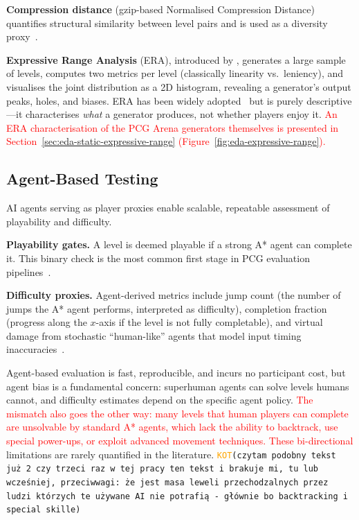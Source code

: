 \documentclass[shortabstract, mgr, english]{iithesis}
\newcommand{\DEBUG}[1]{{#1}} %
\newcommand{\KOT}[1]{\DEBUG{\tt{\textcolor{orange}{KOT}(}{#1}{)}}}
\newcommand{\changed}[1]{\textcolor{red}{#1}}
\begin{document}
\textbf{Compression distance} (gzip-based Normalised Compression Distance)
quantifies structural similarity between level pairs and is used as a diversity
proxy~\citep{shaker2012evolving, horn2014comparative}.

\textbf{Expressive Range Analysis} (ERA), introduced by
\citet{smith2010analyzing}, generates a large sample of levels, computes two
metrics per level (classically linearity vs.\ leniency), and visualises the joint
distribution as a 2D histogram, revealing a generator's output peaks, holes, and
biases. ERA has been widely adopted~\citep{horn2014comparative,
shaker2012evolving} but is purely descriptive---it characterises \emph{what} a
generator produces, not whether players enjoy it.
\changed{An ERA characterisation of the PCG Arena generators themselves is
presented in Section~\ref{sec:eda-static-expressive-range}
(Figure~\ref{fig:eda-expressive-range}).}

\subsection{Agent-Based Testing}
\label{subsec:bg-eval-agents}

AI agents serving as player proxies enable scalable, repeatable assessment of
playability and difficulty.

\textbf{Playability gates.} A level is deemed playable if a strong A* agent can
complete it. This binary check is the most common first stage in PCG evaluation
pipelines~\citep{volz2018evolving, summerville2016super, khalifa2020pcgrl}.

\textbf{Difficulty proxies.} Agent-derived metrics include jump count (the
number of jumps the A* agent performs, interpreted as difficulty), completion
fraction (progress along the $x$-axis if the level is not fully completable),
and virtual damage from stochastic ``human-like'' agents that model input timing
inaccuracies~\citep{nam2024using}.

Agent-based evaluation is fast, reproducible, and incurs no participant cost, but
agent bias is a fundamental concern: superhuman agents can solve levels humans
cannot, and difficulty estimates depend on the specific agent policy. \changed{The mismatch also goes the other way:
many levels that human players can complete are unsolvable by standard A* agents,
which lack the ability to backtrack, use special power-ups, or exploit advanced
movement techniques. These bi-directional} limitations are rarely quantified in
the literature.
\KOT{czytam podobny tekst już 2 czy trzeci raz w tej pracy ten tekst i brakuje mi, tu lub wcześniej, przeciwwagi: że jest masa leweli przechodzalnych przez ludzi którzych te używane AI nie potrafią - głównie bo backtracking i special skille}
\end{document}
